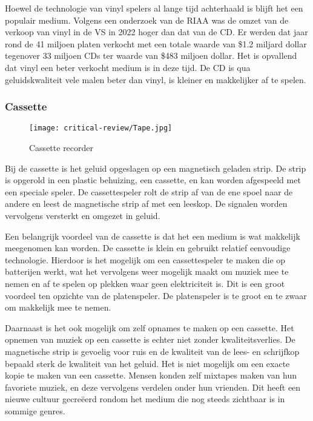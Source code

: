 Hoewel de technologie van vinyl spelers al lange tijd achterhaald is blijft het een populair medium. Volgens een onderzoek van de RIAA \cite{year_end_2022_RIAA_revenue_statistics} was de omzet van de verkoop van vinyl in de VS in 2022 hoger dan dat van de CD. Er werden dat jaar rond de 41 miljoen platen verkocht met een totale waarde van \$1.2 miljard dollar tegenover 33 miljoen CDs ter waarde van \$483 miljoen dollar. Het is opvallend dat vinyl een beter verkocht medium is in deze tijd. De CD is qua geluidskwaliteit vele malen beter dan vinyl, is kleiner en makkelijker af te spelen.


\subsubsection*{Cassette}
\begin{wrapfigure}{r}{0.25\textwidth}
    \centering
    \texttt{[image: critical-review/Tape.jpg]}
    \caption{Cassette recorder}
    \label{fig:critical-review:tape}
\end{wrapfigure}
Bij de cassette is het geluid opgeslagen op een magnetisch geladen strip. De strip is opgerold in een plastic behuizing, een cassette, en kan worden afgespeeld met een speciale speler. De cassettespeler rolt de strip af van de ene spoel naar de andere en leest de magnetische strip af met een leeskop. De signalen worden vervolgens versterkt en omgezet in geluid.

Een belangrijk voordeel van de cassette is dat het een medium is wat makkelijk meegenomen kan worden. De cassette is klein en gebruikt relatief eenvoudige technologie. Hierdoor is het mogelijk om een cassettespeler te maken die op batterijen werkt, wat het vervolgens weer mogelijk maakt om muziek mee te nemen en af te spelen op plekken waar geen elektriciteit is. Dit is een groot voordeel ten opzichte van de platenspeler. De platenspeler is te groot en te zwaar om makkelijk mee te nemen.

Daarnaast is het ook mogelijk om zelf opnames te maken op een cassette. Het opnemen van muziek op een cassette is echter niet zonder kwaliteitsverlies. De magnetische strip is gevoelig voor ruis en de kwaliteit van de lees- en schrijfkop bepaald sterk de kwaliteit van het geluid. Het is niet mogelijk om een exacte kopie te maken van een cassette. Mensen konden zelf mixtapes maken van hun favoriete muziek, en deze vervolgens verdelen onder hun vrienden. Dit heeft een nieuwe cultuur gecreëerd rondom het medium die nog steeds zichtbaar is in sommige genres.

